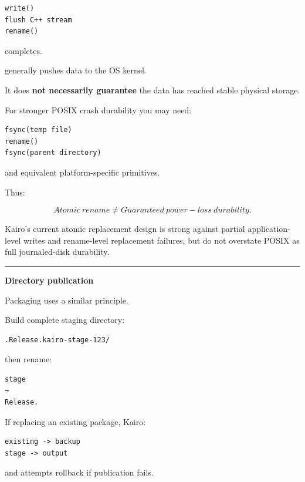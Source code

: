 \begin{verbatim}
write()
flush C++ stream
rename()
\end{verbatim}

completes.

 generally pushes data to the OS kernel.

It does \textbf{not necessarily guarantee} the data has reached stable physical storage.

For stronger POSIX crash durability you may need:

\begin{verbatim}
fsync(temp file)
rename()
fsync(parent directory)
\end{verbatim}

and equivalent platform-specific primitives.

Thus:

\[
\boxed{
Atomic\ rename
\neq
Guaranteed\ power-loss\ durability.
}
\]

Kairo's current atomic replacement design is strong against partial application-level writes and rename-level replacement failures, but do not overstate POSIX  as full journaled-disk durability.

\begin{center}\rule{0.5\linewidth}{0.5pt}\end{center}

\textbf{Directory publication}

Packaging uses a similar principle.

Build complete staging directory:

\begin{verbatim}
.Release.kairo-stage-123/
\end{verbatim}

then rename:

\begin{verbatim}
stage
→
Release.
\end{verbatim}

If replacing an existing package, Kairo:

\begin{verbatim}
existing -> backup
stage -> output
\end{verbatim}

and attempts rollback if publication fails.

